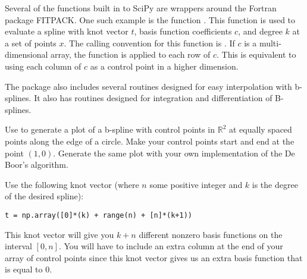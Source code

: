 Several of the functions built in to SciPy are wrappers around the Fortran package FITPACK.
One such example is the function .
This function is used to evaluate a spline with knot vector $t$, basis function coefficients $c$, and degree $k$ at a set of points $x$.
The calling convention for this function is .
If $c$ is a multi-dimensional array, the function is applied to each row of $c$.
This is equivalent to using each column of $c$ as a control point in a higher dimension.

The package  also includes several routines designed for easy interpolation with b-splines.
It also has routines designed for integration and differentiation of B-splines.

\begin{problem}
Use  to generate a plot of a b-spline with control points in $\mathbb{R}^2$ at equally spaced points along the edge of a circle.
Make your control points start and end at the point $\left(1, 0\right)$.
Generate the same plot with your own implementation of the De Boor's algorithm.

Use the following knot vector (where $n$ some positive integer and $k$ is the degree of the desired spline):
\begin{lstlisting}
t = np.array([0]*(k) + range(n) + [n]*(k+1))
\end{lstlisting}
This knot vector will give you $k + n$ different nonzero basis functions on the interval $\left[0, n\right]$.
You will have to include an extra column at the end of your array of control points since this knot vector gives us an extra basis function that is equal to $0$.
\end{problem}
